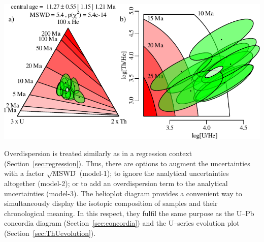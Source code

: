 \begin{refsection}
\noindent\begin{minipage}[t]{.7\linewidth}
\strut\vspace*{-\baselineskip}\newline
\includegraphics[width=\textwidth]{../figures/helioplot.pdf}\\
\end{minipage}
\begin{minipage}[t]{.3\linewidth}
  \label{fig:UThHeIsochronHelioplot}
\end{minipage}

Overdispersion is treated similarly as in a regression context
(Section~\ref{sec:regression}).  Thus, there are options to augment
the uncertainties with a factor $\sqrt{\mbox{MSWD}}$ (model-1); to
ignore the analytical uncertainties altogether (model-2); or to add an
overdispersion term to the analytical uncertainties (model-3).  The
helioplot diagram provides a convenient way to simultaneously display
the isotopic composition of samples and their chronological
meaning. In this respect, they fulfil the same purpose as the U--Pb
concordia diagram (Section~\ref{sec:concordia}) and the U--series
evolution plot (Section~\ref{sec:ThUevolution}).

\printbibliography[heading=subbibliography]

\end{refsection}
